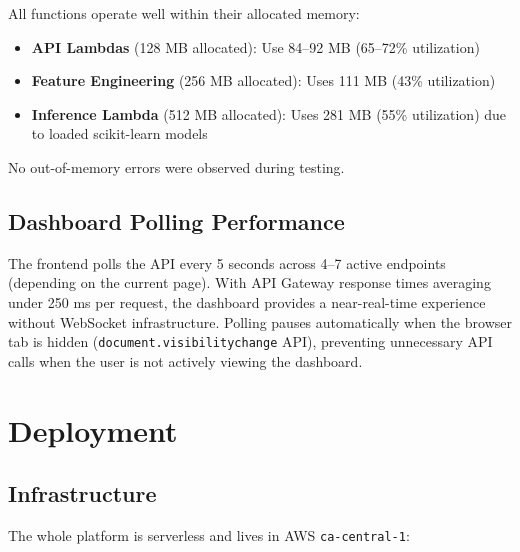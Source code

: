 \documentclass[11pt,a4paper]{article}
\begin{document}
All functions operate well within their allocated memory:

\begin{itemize}[leftmargin=2em]
    \item \textbf{API Lambdas} (128 MB allocated): Use 84--92 MB (65--72\% utilization)
    \item \textbf{Feature Engineering} (256 MB allocated): Uses 111 MB (43\% utilization)
    \item \textbf{Inference Lambda} (512 MB allocated): Uses 281 MB (55\% utilization) due to loaded scikit-learn models
\end{itemize}

No out-of-memory errors were observed during testing.

\subsection{Dashboard Polling Performance}

The frontend polls the API every 5 seconds across 4--7 active endpoints (depending on the current page). With API Gateway response times averaging under 250 ms per request, the dashboard provides a near-real-time experience without WebSocket infrastructure. Polling pauses automatically when the browser tab is hidden (\texttt{document.visibilitychange} API), preventing unnecessary API calls when the user is not actively viewing the dashboard.

\section{Deployment}

\subsection{Infrastructure}

The whole platform is serverless and lives in AWS \texttt{ca-central-1}:
\end{document}
